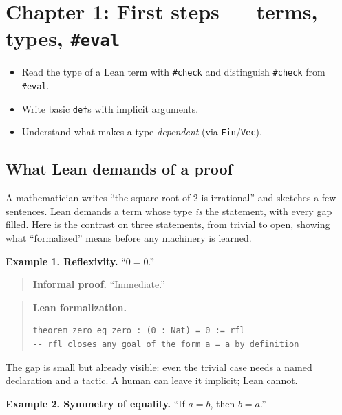 \chapter{\texorpdfstring{Chapter 1: First steps --- terms, types, \texttt{\#eval}}{Chapter 1: First steps --- terms, types, \#eval}}\label{sec:01-basics:00-index:1}

\begin{learningobjectives}
\begin{itemize}
\tightlist
\item
  Read the type of a Lean term with \texttt{\#check} and distinguish \texttt{\#check} from \texttt{\#eval}.
\item
  Write basic \texttt{def}s with implicit arguments.
\item
  Understand what makes a type \emph{dependent} (via \texttt{Fin}/\texttt{Vec}).
\end{itemize}
\end{learningobjectives}


\section*{What Lean demands of a proof}\label{sec:01-basics:00-index:2}

A mathematician writes ``the square root of 2 is irrational'' and sketches a few sentences. Lean demands a term whose type \emph{is} the statement, with every gap filled. Here is the contrast on three statements, from trivial to open, showing what ``formalized'' means before any machinery is learned.

\textbf{Example 1. Reflexivity.} ``\(0 = 0\).''

\begin{quote}
\textbf{Informal proof.} ``Immediate.''
\end{quote}

\begin{quote}
\textbf{Lean formalization.}

\begin{lstlisting}
theorem zero_eq_zero : (0 : Nat) = 0 := rfl
-- rfl closes any goal of the form a = a by definition
\end{lstlisting}
\end{quote}

The gap is small but already visible: even the trivial case needs a named declaration and a tactic. A human can leave it implicit; Lean cannot.

\textbf{Example 2. Symmetry of equality.} ``If \(a = b\), then \(b = a\).''

